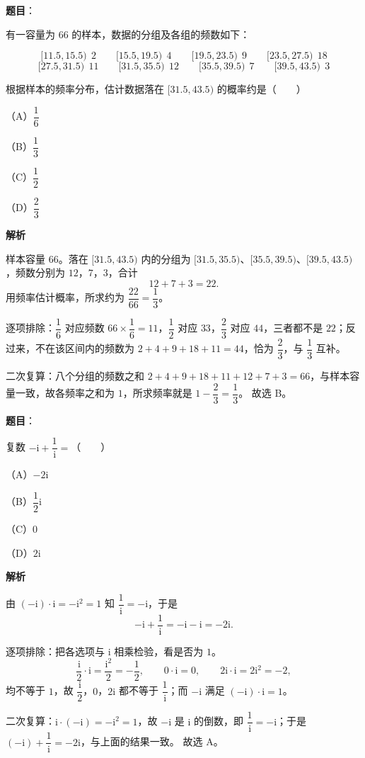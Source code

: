 \begin{answer}

\textbf{题目}：

有一容量为 $66$ 的样本，数据的分组及各组的频数如下：

\nopagebreak[4]
\[[11.5,15.5)\ \ 2 \qquad [15.5,19.5)\ \ 4 \qquad [19.5,23.5)\ \ 9 \qquad [23.5,27.5)\ \ 18\]
\nopagebreak[4]
\[[27.5,31.5)\ \ 11 \qquad [31.5,35.5)\ \ 12 \qquad [35.5,39.5)\ \ 7 \qquad [39.5,43.5)\ \ 3\]

根据样本的频率分布，估计数据落在 $[31.5,43.5)$ 的概率约是\mbox{（　　）}

（A）$\dfrac16$

（B）$\dfrac13$

（C）$\dfrac12$

（D）$\dfrac23$

\textbf{解析}

样本容量 $66$。落在 $[31.5,43.5)$ 内的分组为 $[31.5,35.5)$、$[35.5,39.5)$、$[39.5,43.5)$，频数分别为 $12$，$7$，$3$，合计
\nopagebreak[4]
\[12+7+3=22.\]
用频率估计概率，所求约为 $\dfrac{22}{66}=\dfrac13$。

逐项排除：$\dfrac16$ 对应频数 $66\times\dfrac16=11$，$\dfrac12$ 对应 $33$，$\dfrac23$ 对应 $44$，三者都不是 $22$；反过来，不在该区间内的频数为 $2+4+9+18+11=44$，恰为 $\dfrac23$，与 $\dfrac13$ 互补。

二次复算：八个分组的频数之和 $2+4+9+18+11+12+7+3=66$，与样本容量一致，故各频率之和为 $1$，所求频率就是 $1-\dfrac23=\dfrac13$。
故选 B。


\end{answer}
\begin{answer}

\textbf{题目}：

复数 $-\mathrm i+\dfrac{1}{\mathrm i}=$\mbox{（　　）}

（A）$-2\mathrm i$

（B）$\dfrac12\mathrm i$

（C）$0$

（D）$2\mathrm i$

\textbf{解析}

由 $(-\mathrm i)\cdot\mathrm i=-\mathrm i^2=1$ 知 $\dfrac1{\mathrm i}=-\mathrm i$，于是
\nopagebreak[4]
\[-\mathrm i+\frac1{\mathrm i}=-\mathrm i-\mathrm i=-2\mathrm i.\]

逐项排除：把各选项与 $\mathrm i$ 相乘检验，看是否为 $1$。
\nopagebreak[4]
\[\frac{\mathrm i}{2}\cdot\mathrm i=\frac{\mathrm i^2}{2}=-\frac12,\qquad 0\cdot\mathrm i=0,\qquad 2\mathrm i\cdot\mathrm i=2\mathrm i^2=-2,\]
均不等于 $1$，故 $\dfrac{\mathrm i}{2}$，$0$，$2\mathrm i$ 都不等于 $\dfrac1{\mathrm i}$；而 $-\mathrm i$ 满足 $(-\mathrm i)\cdot\mathrm i=1$。

二次复算：$\mathrm i\cdot(-\mathrm i)=-\mathrm i^2=1$，故 $-\mathrm i$ 是 $\mathrm i$ 的倒数，即 $\dfrac1{\mathrm i}=-\mathrm i$；于是 $(-\mathrm i)+\dfrac1{\mathrm i}=-2\mathrm i$，与上面的结果一致。
故选 A。


\end{answer}
